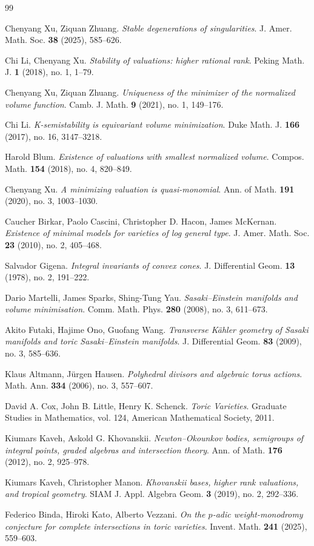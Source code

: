 \documentclass[11pt,a4paper]{article}
\theoremstyle{definition}
\theoremstyle{remark}
\begin{document}
\begin{thebibliography}{99}

Chenyang Xu, Ziquan Zhuang.
\emph{Stable degenerations of singularities}.
J. Amer. Math. Soc. \textbf{38} (2025), 585--626.

Chi Li, Chenyang Xu.
\emph{Stability of valuations: higher rational rank}.
Peking Math. J. \textbf{1} (2018), no. 1, 1--79.

Chenyang Xu, Ziquan Zhuang.
\emph{Uniqueness of the minimizer of the normalized volume function}.
Camb. J. Math. \textbf{9} (2021), no. 1, 149--176.

Chi Li.
\emph{K-semistability is equivariant volume minimization}.
Duke Math. J. \textbf{166} (2017), no. 16, 3147--3218.

Harold Blum.
\emph{Existence of valuations with smallest normalized volume}.
Compos. Math. \textbf{154} (2018), no. 4, 820--849.

Chenyang Xu.
\emph{A minimizing valuation is quasi-monomial}.
Ann. of Math. \textbf{191} (2020), no. 3, 1003--1030.

Caucher Birkar, Paolo Cascini, Christopher D. Hacon, James M{c}Kernan.
\emph{Existence of minimal models for varieties of log general type}.
J. Amer. Math. Soc. \textbf{23} (2010), no. 2, 405--468.

Salvador Gigena.
\emph{Integral invariants of convex cones}.
J. Differential Geom. \textbf{13} (1978), no. 2, 191--222.

Dario Martelli, James Sparks, Shing-Tung Yau.
\emph{Sasaki--Einstein manifolds and volume minimisation}.
Comm. Math. Phys. \textbf{280} (2008), no. 3, 611--673.

Akito Futaki, Hajime Ono, Guofang Wang.
\emph{Transverse K\"ahler geometry of Sasaki manifolds and toric Sasaki--Einstein manifolds}.
J. Differential Geom. \textbf{83} (2009), no. 3, 585--636.

Klaus Altmann, J\"urgen Hausen.
\emph{Polyhedral divisors and algebraic torus actions}.
Math. Ann. \textbf{334} (2006), no. 3, 557--607.

David A. Cox, John B. Little, Henry K. Schenck.
\emph{Toric Varieties}.
Graduate Studies in Mathematics, vol. 124, American Mathematical Society, 2011.

Kiumars Kaveh, Askold G. Khovanskii.
\emph{Newton--Okounkov bodies, semigroups of integral points, graded algebras and intersection theory}.
Ann. of Math. \textbf{176} (2012), no. 2, 925--978.

Kiumars Kaveh, Christopher Manon.
\emph{Khovanskii bases, higher rank valuations, and tropical geometry}.
SIAM J. Appl. Algebra Geom. \textbf{3} (2019), no. 2, 292--336.

Federico Binda, Hiroki Kato, Alberto Vezzani.
\emph{On the $p$-adic weight-monodromy conjecture for complete intersections in toric varieties}.
Invent. Math. \textbf{241} (2025), 559--603.

\end{thebibliography}
\end{document}

